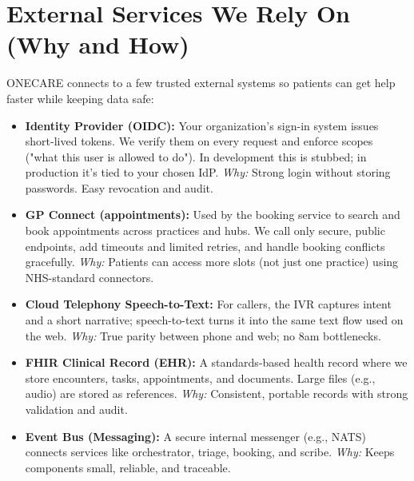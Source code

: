 \documentclass[11pt]{article}
\begin{document}
\section*{External Services We Rely On (Why and How)}
ONECARE connects to a few trusted external systems so patients can get help faster while keeping data safe:
\begin{itemize}
  \item \textbf{Identity Provider (OIDC):} Your organization's sign-in system issues short-lived tokens. We verify them on every request and enforce scopes ("what this user is allowed to do"). In development this is stubbed; in production it's tied to your chosen IdP.\newline
  \textit{Why:} Strong login without storing passwords. Easy revocation and audit.
  \item \textbf{GP Connect (appointments):} Used by the booking service to search and book appointments across practices and hubs. We call only secure, public endpoints, add timeouts and limited retries, and handle booking conflicts gracefully.\newline
  \textit{Why:} Patients can access more slots (not just one practice) using NHS-standard connectors.
  \item \textbf{Cloud Telephony \/ Speech-to-Text:} For callers, the IVR captures intent and a short narrative; speech-to-text turns it into the same text flow used on the web.\newline
  \textit{Why:} True parity between phone and web; no 8am bottlenecks.
  \item \textbf{FHIR Clinical Record (EHR):} A standards-based health record where we store encounters, tasks, appointments, and documents. Large files (e.g., audio) are stored as references.\newline
  \textit{Why:} Consistent, portable records with strong validation and audit.
  \item \textbf{Event Bus (Messaging):} A secure internal messenger (e.g., NATS) connects services like orchestrator, triage, booking, and scribe.\newline
  \textit{Why:} Keeps components small, reliable, and traceable.
\end{itemize}
\end{document}

